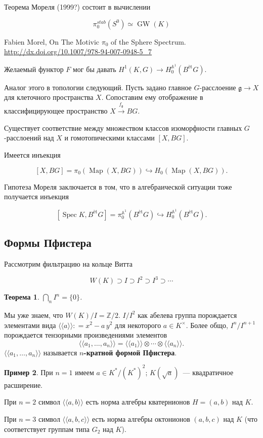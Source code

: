 \documentclass[a4paper]{article}
\DeclareMathOperator{\Spec}{Spec}
\DeclareMathOperator{\Map}{Map}
\DeclareMathOperator{\GW}{GW}
\newcommand{\term}{\textbf}
\newcommand{\dfn}{\mathrel{\mathop:}=}
\newcommand{\isom}{\simeq}
\newtheorem{theorem}{Теорема}[subsection]
\theoremstyle{definition}
\newtheorem{example}[theorem]{Пример}
\newcommand{\lAngle}{\langle\!\langle}
\newcommand{\rAngle}{\rangle\!\rangle}
\begin{document}
Теорема Мореля (1999?) состоит в вычислении

\[ \pi_0^{stab} (S^0) \isom \GW (K) \]

Fabien Morel, On The Motivic $\pi_0$ of the Sphere Spectrum.\\
\url{http://dx.doi.org/10.1007/978-94-007-0948-5_7}

Желаемый функтор $F$ мог бы давать $H^1 (K,G) \to H_0^{\mathbb{A}^1} (B^\text{èt} G)$.

Аналог этого в топологии следующий. Пусть задано главное
$G$-расслоение $\mathfrak{g} \to X$ для клеточного пространства
$X$. Сопоставим ему отображение в классифицирующее пространство $X
\xrightarrow{f_\mathfrak{g}} BG$.

Существует соответствие между множеством классов изоморфности главных
$G$-расслоений над $X$ и гомотопическими классами $[X,BG]$.

Имеется инъекция

\[ [X,BG] = \pi_0 (\Map (X,BG)) \hookrightarrow H_0 (\Map (X,BG)). \]

Гипотеза Мореля заключается в том, что в алгебраической ситуации тоже получается инъекция

\[ [\Spec K, B^\text{èt} G] = \pi_0^{\mathbb{A}^1} (B^\text{èt} G)
\hookrightarrow H_0^{\mathbb{A}^1} (B^\text{èt} G). \]

\subsection{Формы Пфистера}

Рассмотрим фильтрацию на кольце Витта

\[ W(K) \supset I \supset I^2 \supset I^3 \supset \cdots \]

\begin{theorem}
$\bigcap_n I^n = \{0\}$.
\end{theorem}

Мы уже знаем, что $W(K) / I = \mathbb{Z}/2$.
$I/I^2$ как абелева группа порождается элементами вида $\lAngle a\rAngle \dfn x^2 - a\,y^2$ для некоторого $a\in K^\times$.
Более общо, $I^n/I^{n+1}$ порождается тензорными произведениями элементов
\[ \lAngle a_1, \ldots, a_n\rAngle = \lAngle a_1\rAngle\otimes\cdots\otimes\lAngle a_n\rAngle. \]
$\lAngle a_1, \ldots, a_n\rAngle$ называется \term{$n$-кратной формой Пфистера}.

\begin{example}
При $n = 1$ имеем $a \in K^*/(K^*)^2$; $K (\sqrt{a})$~--- квадратичное расширение.

При $n = 2$ символ $\lAngle a,b\rAngle$ есть норма алгебры кватернионов
$H = (a,b)$ над $K$.

При $n = 3$ символ $\lAngle a,b,c\rAngle$ есть норма алгебры октонионов
$(a,b,c)$ над $K$ (что соответствует группам типа $G_2$ над $K$).
\end{example}
\end{document}
